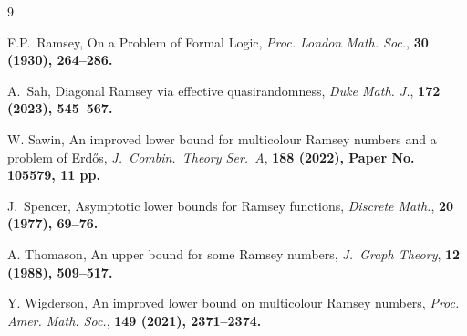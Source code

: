 \documentclass[12pt,reqno]{amsart}
\theoremstyle{definition}
\theoremstyle{remark}
\begin{document}
\begin{thebibliography}{9}

 F.P.~Ramsey, 
On a Problem of Formal Logic, 
\emph{Proc. London Math. Soc.}, \bf 30 \rm (1930), 264--286.

 A.~Sah, 
Diagonal Ramsey via effective quasirandomness, 
\emph{Duke Math. J.}, \bf 172 \rm (2023), 545--567.

 W. Sawin, 
An improved lower bound for multicolour Ramsey numbers and a problem of Erd\H{o}s, 
\emph{J.~Combin.~Theory Ser.~A}, \bf 188 \rm (2022), Paper No. 105579, 11 pp.

 J.~Spencer, 
Asymptotic lower bounds for Ramsey functions, 
\emph{Discrete Math.}, \bf 20 \rm (1977), 69--76. 

 A. Thomason, 
An upper bound for some Ramsey numbers, 
\emph{J.~Graph Theory}, \bf 12 \rm (1988), 509--517.

 Y. Wigderson, 
An improved lower bound on multicolour Ramsey numbers, 
\emph{Proc. Amer. Math. Soc.}, \bf 149 \rm (2021), 2371--2374.

\end{thebibliography}
\end{document}
